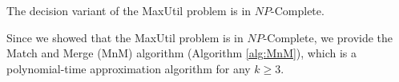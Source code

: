 \documentclass[sigconf]{aamas}
\begin{document}
\begin{theorem}
The decision variant of the MaxUtil problem is in $NP$-Complete.
\end{theorem}

Since we showed that the MaxUtil problem is in $NP$-Complete, we provide the Match and Merge (MnM) algorithm (Algorithm \ref{alg:MnM}), which is a polynomial-time approximation algorithm for any $k \geq 3$. 
 
\end{document}
